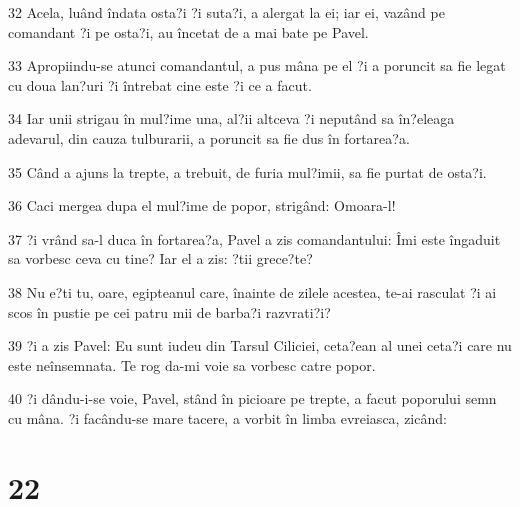 \par 32 Acela, luând îndata osta?i ?i suta?i, a alergat la ei; iar ei, vazând pe comandant ?i pe osta?i, au încetat de a mai bate pe Pavel.
\par 33 Apropiindu-se atunci comandantul, a pus mâna pe el ?i a poruncit sa fie legat cu doua lan?uri ?i întrebat cine este ?i ce a facut.
\par 34 Iar unii strigau în mul?ime una, al?ii altceva ?i neputând sa în?eleaga adevarul, din cauza tulburarii, a poruncit sa fie dus în fortarea?a.
\par 35 Când a ajuns la trepte, a trebuit, de furia mul?imii, sa fie purtat de osta?i.
\par 36 Caci mergea dupa el mul?ime de popor, strigând: Omoara-l!
\par 37 ?i vrând sa-l duca în fortarea?a, Pavel a zis comandantului: Îmi este îngaduit sa vorbesc ceva cu tine? Iar el a zis: ?tii grece?te?
\par 38 Nu e?ti tu, oare, egipteanul care, înainte de zilele acestea, te-ai rasculat ?i ai scos în pustie pe cei patru mii de barba?i razvrati?i?
\par 39 ?i a zis Pavel: Eu sunt iudeu din Tarsul Ciliciei, ceta?ean al unei ceta?i care nu este neînsemnata. Te rog da-mi voie sa vorbesc catre popor.
\par 40 ?i dându-i-se voie, Pavel, stând în picioare pe trepte, a facut poporului semn cu mâna. ?i facându-se mare tacere, a vorbit în limba evreiasca, zicând:

\chapter{22}

